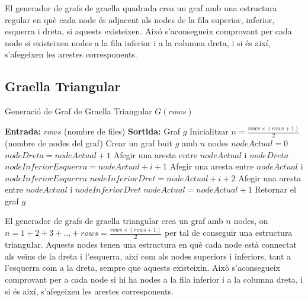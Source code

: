\documentclass[a4paper]{article}
\begin{document}
	El generador de grafs de graella quadrada crea un graf amb una estructura regular en què cada node és adjacent als nodes de la fila superior, inferior, esquerra i dreta, si aquests existeixen. Aixó s'aconsegueix comprovant per cada node si existeixen nodes a la fila inferior i a la columna dreta, i si és així, s'afegeixen les arestes corresponents. \\

	\subsection{Graella Triangular}

	\begin{algorithm} [H]
		\caption{Generació de Graf de Graella Triangular $G(rows)$}
		\begin{algorithmic} [1]
			\Statex \textbf{Entrada:} $rows$ (nombre de files)
			\Statex \textbf{Sortida:} Graf $g$
			\Statex \vspace{-0.25em}
			\State Inicialitzar $n = \frac{rows \times (rows + 1)}{2}$ (nombre de nodes del graf)
			\State Crear un graf buit $g$ amb $n$ nodes
			\State $nodeActual = 0$
						\State $nodeDreta = nodeActual + 1$
						\State Afegir una aresta entre $nodeActual$ i $nodeDreta$
					\EndIf
						\State $nodeInferiorEsquerra = nodeActual + i + 1$
						\State Afegir una aresta entre $nodeActual$ i $nodeInferiorEsquerra$
						\State $nodeInferiorDret = nodeActual + i + 2$
						\State Afegir una aresta entre $nodeActual$ i $nodeInferiorDret$
					\EndIf
					\State $nodeActual = nodeActual + 1$
				\EndFor
			\EndFor
			\State Retornar el graf $g$
		\end{algorithmic}
	\end{algorithm}
	
	El generador de grafs de graella triangular crea un graf amb \( n \) nodes, on \( n = 1 + 2 + 3 + \ldots + rows = \frac{rows \times (rows + 1)}{2} \) per tal de conseguir una estructura triangular. Aquests nodes tenen una estructura en què cada node està connectat als veïns de la dreta i l'esquerra, així com als nodes superiors i inferiors, tant a l'esquerra com a la dreta, sempre que aquests existeixin. Això s'aconsegueix comprovant per a cada node si hi ha nodes a la fila inferior i a la columna dreta, i si és així, s'afegeixen les arestes corresponents. \\
\end{document}
